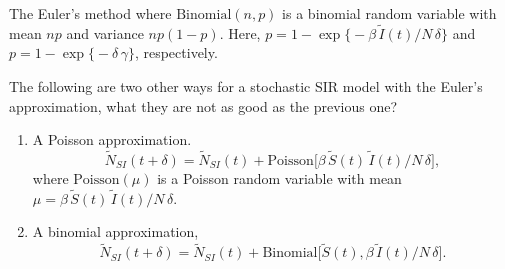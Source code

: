 \documentclass[
  ignorenonframetext,
  aspectratio=169,
  t]{beamer}
\theoremstyle{definition}
\begin{document}
\begin{frame}[allowframebreaks]{The Euler's method}
where \(\mathrm{Binomial}(n,p)\) is a binomial random variable with mean
\(np\) and variance \(np(1-p)\). Here,
\(p=1-\exp\big\{-\beta\,\tilde I(t)/ N\,\delta\big\}\) and
\(p=1-\exp\big\{-\delta\,\gamma\big\}\), respectively.

\framebreak

The following are two other ways for a stochastic SIR model with the
Euler's approximation, what they are not as good as the previous one?

\begin{enumerate}
\item
  A Poisson approximation.
  \[\tilde N_{SI}(t+\delta)= \tilde N_{SI}(t) + \mathrm{Poisson}\big[\beta\,\tilde S(t)\,\tilde I(t) / N\, \delta\big],\]
  where \(\mathrm{Poisson}(\mu)\) is a Poisson random variable with mean
  \(\mu=\beta\,\tilde S(t)\,\tilde I(t) / N\, \delta\).
\item
  A binomial approximation,
  \[\tilde N_{SI}(t+\delta) = \tilde N_{SI}(t) + \mathrm{Binomial}\big[\tilde S(t),\beta\,\tilde I(t) / N \, \delta\big].\]
\end{enumerate}
\end{frame}
\end{document}

